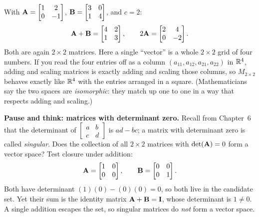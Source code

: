 \begin{example}\label{ch11:matrix-space}
With $\mathbf{A} = \begin{bmatrix}1&2\\0&-1\end{bmatrix}$,
$\mathbf{B} = \begin{bmatrix}3&0\\1&4\end{bmatrix}$, and $c = 2$:
\[
\mathbf{A}+\mathbf{B} = \begin{bmatrix}4&2\\1&3\end{bmatrix},
\qquad
2\mathbf{A} = \begin{bmatrix}2&4\\0&-2\end{bmatrix}.
\]
Both are again $2\times 2$ matrices. Here a single ``vector'' is a whole $2\times 2$ grid
of four numbers. If you read the four entries off as a column
$(a_{11},a_{12},a_{21},a_{22})$ in $\mathbb{R}^4$, adding and scaling matrices is exactly adding and
scaling those columns, so $M_{2\times 2}$ behaves exactly like $\mathbb{R}^4$ with the entries
arranged in a square. (Mathematicians say the two spaces are \emph{isomorphic}: they match
up one to one in a way that respects adding and scaling.)

\begin{recoverybox}
\textbf{Pause and think: matrices with determinant zero.}
Recall from Chapter~6 that the determinant of
$\begin{bmatrix}a&b\\c&d\end{bmatrix}$ is $ad-bc$; a matrix with determinant zero is
called \emph{singular}.
Does the collection of all $2\times 2$ matrices with $\det(\mathbf{A}) = 0$ form a vector
space? Test closure under addition:
\[
\mathbf{A} = \begin{bmatrix}1 & 0 \\ 0 & 0\end{bmatrix}, \qquad
\mathbf{B} = \begin{bmatrix}0 & 0 \\ 0 & 1\end{bmatrix}.
\]
Both have determinant $(1)(0) - (0)(0) = 0$, so both live in the candidate set. Yet their
sum is the identity matrix $\mathbf{A}+\mathbf{B} = \mathbf{I}$, whose determinant is $1 \ne 0$.
A single addition escapes the set, so singular matrices do \emph{not} form a vector space.
\end{recoverybox}
\end{example}

